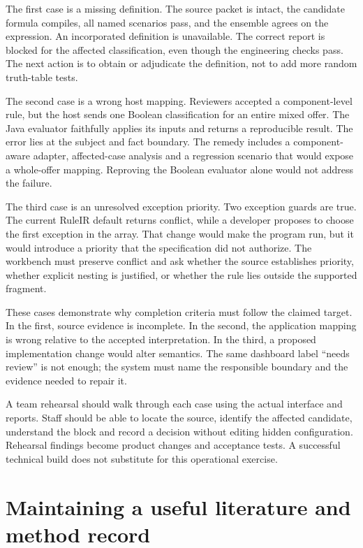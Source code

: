 The first case is a missing definition. The source packet is intact, the candidate
formula compiles, all named scenarios pass, and the ensemble agrees on the
expression. An incorporated definition is unavailable. The correct report is
blocked for the affected classification, even though the engineering checks pass.
The next action is to obtain or adjudicate the definition, not to add more random
truth-table tests.

The second case is a wrong host mapping. Reviewers accepted a component-level
rule, but the host sends one Boolean classification for an entire mixed offer.
The Java evaluator faithfully applies its inputs and returns a reproducible
result. The error lies at the subject and fact boundary. The remedy includes a
component-aware adapter, affected-case analysis and a regression scenario that
would expose a whole-offer mapping. Reproving the Boolean evaluator alone would
not address the failure.

The third case is an unresolved exception priority. Two exception guards are
true. The current RuleIR default returns conflict, while a developer proposes to
choose the first exception in the array. That change would make the program run,
but it would introduce a priority that the specification did not authorize. The
workbench must preserve conflict and ask whether the source establishes priority,
whether explicit nesting is justified, or whether the rule lies outside the
supported fragment.

These cases demonstrate why completion criteria must follow the claimed target.
In the first, source evidence is incomplete. In the second, the application mapping
is wrong relative to the accepted interpretation. In the third, a proposed
implementation change would alter semantics. The same dashboard label ``needs
review'' is not enough; the system must name the responsible boundary and the
evidence needed to repair it.

A team rehearsal should walk through each case using the actual interface and
reports. Staff should be able to locate the source, identify the affected
candidate, understand the block and record a decision without editing hidden
configuration. Rehearsal findings become product changes and acceptance tests.
A successful technical build does not substitute for this operational exercise.

\section{Maintaining a useful literature and method record}

